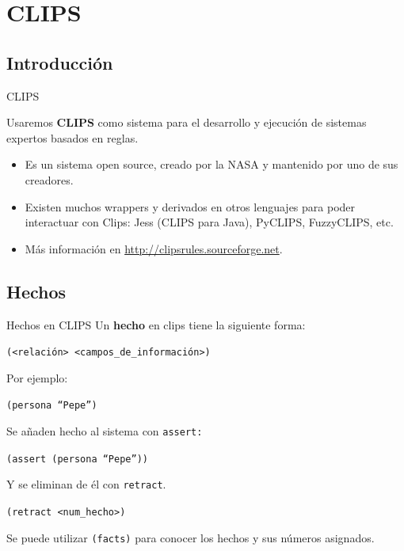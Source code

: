 \documentclass[smaller,spanish,xcolor=svgnames]{beamer}
\begin{document}
\section{CLIPS}

\subsection{Introducción}

\begin{frame}{CLIPS}
  \begin{block}{}
    Usaremos \textbf{CLIPS} como sistema para el desarrollo y ejecución de
    sistemas expertos basados en reglas.
  \end{block}

  \begin{itemize}
  \item Es un sistema open source, creado por la NASA y mantenido por uno de sus
    creadores.
  \item Existen muchos wrappers y derivados en otros lenguajes para poder
    interactuar con Clips: Jess (CLIPS para Java), PyCLIPS, FuzzyCLIPS, etc.
  \item Más información en \url{http://clipsrules.sourceforge.net}.
  \end{itemize}
\end{frame}

\subsection{Hechos}

\begin{frame}{Hechos en CLIPS}
  Un \textbf{hecho} en clips tiene la siguiente forma:

  \texttt{(<relación> <campos\_de\_información>)}

  \bigskip

  Por ejemplo:

  \texttt{(persona ``Pepe'')}

  \bigskip

  Se añaden hecho al sistema con \texttt{assert:}

  \texttt{(assert (persona ``Pepe''))}

  \bigskip

  Y se eliminan de él con \texttt{retract}. 

  \texttt{(retract <num\_hecho>)}

  \medskip

  Se puede utilizar \texttt{(facts)} para conocer los hechos y sus números
  asignados.
  
\end{frame}
\end{document}
